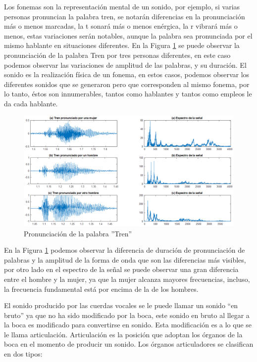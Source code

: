 Los fonemas son la representación mental de un sonido, por ejemplo, si varias personas pronuncian la palabra tren, se notarán diferencias en la pronunciación más o menos marcadas, la t sonará más o menos enérgica, la r vibrará más o menos, estas variaciones serán notables, aunque la palabra sea pronunciada por el mismo hablante en situaciones diferentes. En la Figura \ref{fig:trenWord} se puede observar la pronunciación de la palabra Tren por tres personas diferentes, en este caso podemos observar las variaciones de amplitud de las palabras, y su duración. El sonido es la realización física de un fonema, en estos casos, podemos observar los diferentes sonidos que se generaron pero que corresponden al mismo fonema, por lo tanto, éstos son innumerables, tantos como hablantes y tantos como empleos le da cada hablante.

\begin{figure}[H]
	\centering
	\includegraphics[width=1\linewidth]{figures/trenWord}
	\caption{Pronunciación de la palabra ''Tren''}
	\label{fig:trenWord}
\end{figure}

En la Figura \ref{fig:trenWord} podemos observar la diferencia de duración de pronunciación de palabras y la amplitud de la forma de onda que son las diferencias más visibles, por otro lado en el espectro de la señal se puede observar una gran diferencia entre el hombre y la mujer, ya que la mujer alcanza mayores frecuencias, incluso, la frecuencia fundamental está por encima de la de los hombres.

El sonido producido por las cuerdas vocales se le puede llamar un sonido “en bruto” ya que no ha sido modificado por la boca, este sonido en bruto al llegar a la boca es modificado para convertirse en sonido. Esta modificación es a lo que se le llama articulación. Articulación es la posición que adoptan los órganos de la boca en el momento de producir un sonido. Los órganos articuladores se clasifican en dos tipos:

